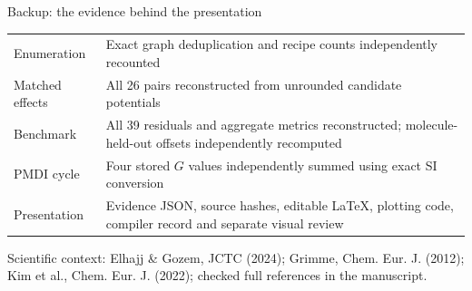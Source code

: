 \begin{frame}{Backup: the evidence behind the presentation}
\small\renewcommand{\arraystretch}{1.4}
\begin{tabular}{@{}lp{9.5cm}@{}}\toprule
Enumeration & Exact graph deduplication and recipe counts independently recounted\\
Matched effects & All 26 pairs reconstructed from unrounded candidate potentials\\
Benchmark & All 39 residuals and aggregate metrics reconstructed; molecule-held-out offsets independently recomputed\\
PMDI cycle & Four stored $G$ values independently summed using exact SI conversion\\
Presentation & Evidence JSON, source hashes, editable \LaTeX{}, plotting code, compiler record and separate visual review\\\bottomrule
\end{tabular}
\par\medskip\small Scientific context: Elhajj \& Gozem, JCTC (2024); Grimme, Chem. Eur. J. (2012); Kim et al., Chem. Eur. J. (2022); checked full references in the manuscript.
\end{frame}
